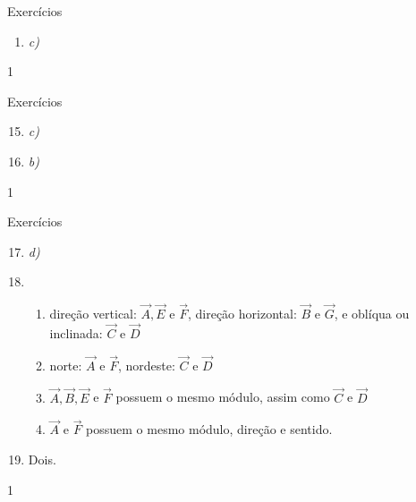\begin{answer}{Exercícios}
{\begin{enumerate}
\begin{center}\end{center}

Se \(P_1=(a,b)\), então \(\overrightarrow{AP_1}=(a+4,b-4)\). Logo, \((a+4,b-4)=\frac13(6,-3)=(2,-1)\), donde concluímos que \(a=-2\) e \(b=3\). Portanto, \(P_1=(-2,3)\).

Considere agora \(P_2=(c,d)\). Neste caso, \(\overrightarrow{P_1P_2}=(c+2,d-3)=\frac13(6,-3)=(2,-1)\). Assim, \(c=0\) e \(d=2\). Portanto, \(P_2=(0,2)\).

\item \textit{c)}
\end{enumerate}
}{1}
\end{answer}
\clearmargin

\begin{answer}{Exercícios}
{\exerciselist
\begin{enumerate}\setcounter{enumi}{14}
\item \textit{c)}
\item \textit{b)}
\end{enumerate}
}{1}
\end{answer}
\clearmargin

\begin{answer}{Exercícios}
{\exerciselist
\begin{enumerate}\setcounter{enumi}{16}
\item \textit{d)}

\item 
\begin{enumerate}
\item {} 
direção vertical: \(\vec{A}, \vec{E}\) e \(\vec{F}\), direção horizontal:  \(\vec{B}\) e \(\vec{G}\), e oblíqua ou inclinada: \(\vec{C}\) e \(\vec{D}\)

\item {} 
norte: \(\vec{A}\) e \(\vec{F}\), nordeste: \(\vec{C}\) e \(\vec{D}\)

\item {} 
\(\vec{A},\vec{B},\vec{E}\) e \(\vec{F}\) possuem o mesmo módulo, assim como \(\vec{C}\) e \(\vec{D}\)

\item {} 
\(\vec{A}\) e \(\vec{F}\) possuem o mesmo módulo, direção e sentido.

\end{enumerate}

\item Dois.
\end{enumerate}
}{1}
\end{answer}
\clearmargin

